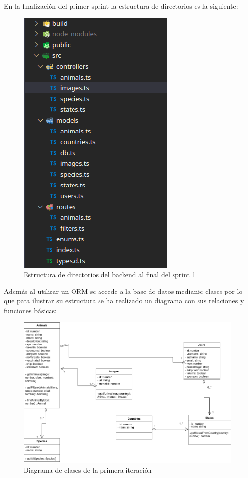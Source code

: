 	En la finalización del primer sprint la estructura de directorios es la siguiente:
	
	\begin{figure}[H]
		\centering
		\includegraphics[width=0.7\linewidth]{"sprint 1/directoriosBack"}
		\caption{Estructura de directorios del backend al final del sprint 1}
		\label{fig:directoriosback1}
	\end{figure}
	
	Además al utilizar un ORM se accede a la base de datos mediante clases por lo que para ilustrar su estructura se ha realizado un diagrama con sus relaciones y funciones básicas:
	
	\begin{figure}[H]
		\centering
		\includegraphics[width=1\linewidth]{"sprint 1/clases"}
		\caption{Diagrama de clases de la primera iteración}
		\label{fig:clases}
	\end{figure}


